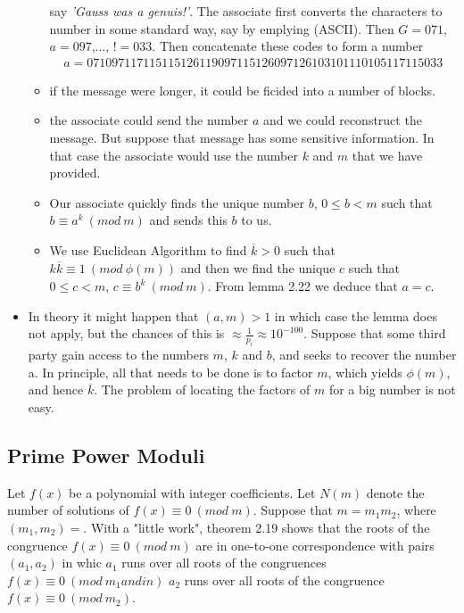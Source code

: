 \documentclass[a4paper]{article}
\begin{document}
\begin{itemize}
\begin{itemize}
        say \textit{'Gauss was a genuis!'}. The associate first converts the
        characters to number in some standard way, say by emplying (ASCII).
        Then $G=071$, $a=097$,..., $!=033$.
        Then concatenate these codes to form a number
        \begin{align*}
            a=071097117115115126119097115126097126103101110105117115033
        \end{align*}
        \item if the message were longer, it could be ficided into a number of blocks.
        \item the associate could send the number $a$ and we could reconstruct the
        message. But suppose that message has some sensitive information. In that
        case the associate would use the number $k$ and $m$ that we have provided.
        \item Our associate quickly finds the unique number $b$, $0\leq b<m$
        such that $b\equiv a^k\ (mod\ m)$ and sends this $b$ to us.
        \item We use Euclidean Algorithm to find $\overline{k}>0$ such that\\
        $k\overline{k}\equiv 1\ (mod\ \phi(m))$ and then we find the unique $c$
        such that $0\leq c<m$, $c\equiv b^{\overline{k}}\ (mod\ m)$.
        From lemma 2.22 we deduce that $a=c$.
    \end{itemize}
    \item In theory it might happen that $(a,m)>1$ in which case the lemma does
    not apply, but the chances of this is $\approx\frac{1}{p_i}\approx 10^{-100}$.
    Suppose that some third party gain access to the numbers $m$, $k$ and $b$,
    and seeks to recover the number a. In principle, all that needs to be done
    is to factor $m$, which yields $\phi(m)$, and hence $\overline{k}$.
    The problem of locating the factors of $m$ for a big number is not easy.
\end{itemize}


\subsection{Prime Power Moduli}

Let $f(x)$ be a polynomial with integer coefficients. Let $N(m)$ denote the
number of solutions of $f(x)\equiv 0\ (mod\ m)$. Suppose that $m=m_1m_2$, where
$(m_1,m_2)=$. With a "little work", theorem 2.19 shows that the roots of the
congruence $f(x)\equiv 0\ (mod\ m)$ are in one-to-one correspondence with pairs
$(a_1,a_2)$ in whic $a_1$ runs over all roots of the congruences
$f(x)\equiv 0\ (mod\ m_1and in)$ $a_2$ runs over all roots of the congruence
$f(x)\equiv 0\ (mod\ m_2)$.
\end{document}
